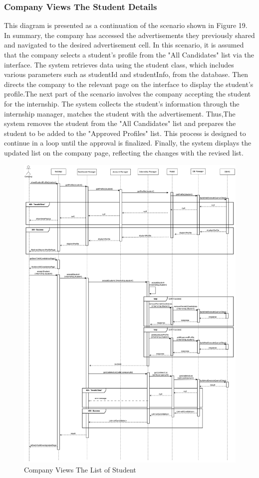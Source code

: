 \documentclass[a4paper,12pt]{article}
\begin{document}
\subsubsection*{ Company Views The Student Details} 
This diagram is presented as a continuation of the scenario shown in Figure 19. In summary, the company has accessed the advertisements they previously shared and navigated to the desired advertisement cell. In this scenario, it is assumed that the company selects a student's profile from the "All Candidates" list via the interface. The system retrieves data using the student class, which includes various parameters such as studentId and studentInfo, from the database. Then directs the company to the relevant page on the interface to display the student's profile.The next part of the scenario involves the company accepting the student for the internship. The system collects the student's information through the internship manager, matches the student with the advertisement. Thus,The system removes the student from the "All Candidates" list and prepares the student to be added to the "Approved Profiles" list. This process is designed to continue in a loop until the approval is finalized. Finally, the system displays the updated list on the company page, reflecting the changes with the revised list.
\begin{figure}[H]
    \centering
    \includegraphics[scale = 0.25]{DD_figures/RuntimeView/companyViewStudentDetails.drawio.png}
    \caption{Company Views The List of Student}
    \centering
\end{figure}
\newpage
\end{document}
